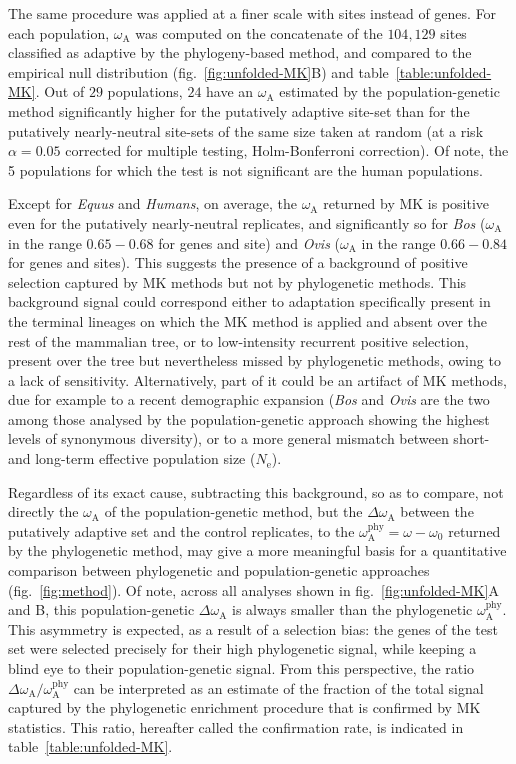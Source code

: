 \documentclass{article}
\newcommand{\Ne}{N_{\mathrm{e}}}
\newcommand{\rateApop}{\omega_{\mathrm{A}}}
\newcommand{\rateAphy}{\rateApop^{\mathrm{phy}}}
\begin{document}
    The same procedure was applied at a finer scale with sites instead of genes.
    For each population, $\rateApop$ was computed on the concatenate of the $104,129$ sites classified as adaptive by the phylogeny-based method, and compared to the empirical null distribution (fig.~\ref{fig:unfolded-MK}B) and table~\ref{table:unfolded-MK}.
    Out of $29$ populations, $24$ have an $\rateApop$ estimated by the population-genetic method significantly higher for the putatively adaptive site-set than for the putatively nearly-neutral site-sets of the same size taken at random (at a risk $\alpha=0.05$ corrected for multiple testing, Holm-Bonferroni correction).
    Of note, the 5 populations for which the test is not significant are the human populations.

    Except for \textit{Equus} and \textit{Humans}, on average, the $\rateApop$ returned by MK is positive even for the putatively nearly-neutral replicates, and significantly so for \textit{Bos} ($\rateApop$ in the range $0.65-0.68$ for genes and site) and \textit{Ovis} ($\rateApop$ in the range $0.66-0.84$ for genes and sites).
    This suggests the presence of a background of positive selection captured by MK methods but not by phylogenetic methods.
    This background signal could correspond either to adaptation specifically present in the terminal lineages on which the MK method is applied and absent over the rest of the mammalian tree, or to low-intensity recurrent positive selection, present over the tree but nevertheless missed by phylogenetic methods, owing to a lack of sensitivity.
    Alternatively, part of it could be an artifact of MK methods, due for example to a recent demographic expansion (\textit{Bos} and \textit{Ovis} are the two among those analysed by the population-genetic approach showing the highest levels of synonymous diversity), or to a more general mismatch between short- and long-term effective population size ($\Ne$)\cite{rousselle_overestimation_2018}.

    Regardless of its exact cause, subtracting this background, so as to compare, not directly the $\rateApop$ of the population-genetic method, but the $\Delta \rateApop$ between the putatively adaptive set and the control replicates, to the $\rateAphy= \omega - \omega_0$ returned by the phylogenetic method, may give a more meaningful basis for a quantitative comparison between phylogenetic and population-genetic approaches (fig.~\ref{fig:method}).
    Of note, across all analyses shown in fig.~\ref{fig:unfolded-MK}A and B, this population-genetic $\Delta \rateApop$ is always smaller than the phylogenetic $\rateAphy$.
    This asymmetry is expected, as a result of a selection bias: the genes of the test set were selected precisely for their high phylogenetic signal, while keeping a blind eye to their population-genetic signal.
    From this perspective, the ratio $\Delta \rateApop /  \rateAphy$ can be interpreted as an estimate of the fraction of the total signal captured by the phylogenetic enrichment procedure that is confirmed by MK statistics.
    This ratio, hereafter called the confirmation rate, is indicated in table~\ref{table:unfolded-MK}.
\end{document}
